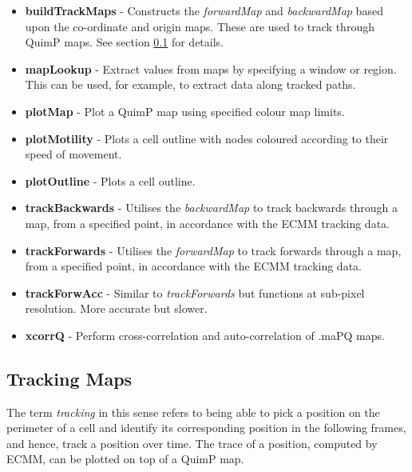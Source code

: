 \documentclass[a4paper,12pt]{article}
\begin{document}
\begin{itemize}

 \item \textbf{buildTrackMaps} - Constructs the \textit{forwardMap} and \textit{backwardMap} based 
 upon the co-ordinate and origin maps.  These are used to track through QuimP maps.  See section \ref{trackingMaps} for details.
 
 \item \textbf{mapLookup} - Extract values from maps by specifying a window or region.  This can be used, for example, to extract data
 along tracked paths.
 
 \item \textbf{plotMap} - Plot a QuimP map using specified colour map limits.
 
 \item \textbf{plotMotility} - Plots a cell outline with nodes coloured according to their speed of movement.
 
 \item \textbf{plotOutline} - Plots a cell outline.
 
 \item \textbf{trackBackwards} - Utilises the \textit{backwardMap} to track backwards through a map, from a specified point,
 in accordance with the ECMM tracking data. 
 
 \item \textbf{trackForwards} - Utilises the \textit{forwardMap} to track forwards through a map, from a specified point,
 in accordance with the ECMM tracking data.
 
  \item \textbf{trackForwAcc} - Similar to \textit{trackForwards} but functions at sub-pixel resolution. More accurate but slower.
   
 \item \textbf{xcorrQ} - Perform cross-correlation and auto-correlation of .maPQ maps.
 
 \end{itemize}

\subsection{Tracking Maps}
\label{trackingMaps}

The term \textit{tracking} in this sense refers to being able to pick a position on the perimeter of a cell and identify its corresponding
position in the following frames, and hence, track a position over time.  The trace of a position, computed by ECMM,
can be plotted on top of a QuimP map. 
\end{document}
